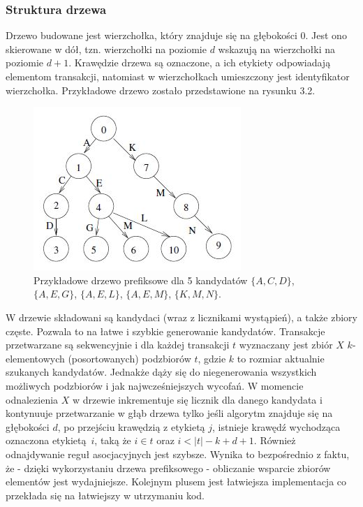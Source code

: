 \subsubsection*{Struktura drzewa}
Drzewo budowane jest wierzchołka, który znajduje się na głębokości 0. Jest ono skierowane w dół, tzn. wierzchołki na poziomie \(d\) wskazują na wierzchołki na poziomie \(d + 1\). Krawędzie drzewa są oznaczone, a ich etykiety odpowiadają elementom transakcji, natomiast w wierzchołkach umieszczony jest identyfikator wierzchołka. Przykładowe drzewo zostało przedstawione na rysunku 3.2. 
\begin{figure}[h]
	\centering
	\includegraphics[width=0.5\linewidth]{figures/prefixTreeBodon}
	\caption[Rysunek 3.2]{Przykładowe drzewo prefiksowe dla 5 kandydatów \(\{A,C,D\}\), \(\{A,E,G\}\), \(\{A,E,L\}\), \(\{A,E,M\}\), \(\{K,M,N\}\).}
	\label{fig:prefixTreeBodon}
\end{figure}
W drzewie składowani są kandydaci (wraz z licznikami wystąpień), a także zbiory częste. Pozwala to na łatwe i szybkie generowanie kandydatów. Transakcje przetwarzane są sekwencyjnie i dla każdej transakcji \(t\) wyznaczany jest zbiór \(X\) \(k\)-elementowych (posortowanych) podzbiorów \(t\), gdzie \(k\) to rozmiar aktualnie szukanych kandydatów. Jednakże dąży się do niegenerowania wszystkich możliwych podzbiorów i jak najwcześniejszych wycofań. W momencie odnalezienia \(X\) w drzewie inkrementuje się licznik dla danego kandydata i kontynuuje przetwarzanie w głąb drzewa tylko jeśli algorytm znajduje się na głębokości \(d\), po przejściu krawędzią z etykietą \(j\), istnieje krawędź wychodząca oznaczona etykietą~\(i\), taką że \(i\in t\) oraz \(i < |t| - k + d + 1\). Również odnajdywanie reguł asocjacyjnych jest szybsze. Wynika to bezpośrednio z faktu, że - dzięki wykorzystaniu drzewa prefiksowego - obliczanie wsparcie zbiorów elementów jest wydajniejsze. Kolejnym plusem jest łatwiejsza implementacja co przekłada się na łatwiejszy w utrzymaniu kod.  


